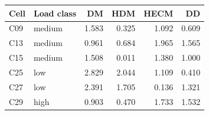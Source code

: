 \begin{tabular}{llrrrr}
\toprule
Cell & Load class & DM & HDM & HECM & DD \\
\midrule
C09 & medium & 1.583 & 0.325 & 1.092 & 0.609 \\
C13 & medium & 0.961 & 0.684 & 1.965 & 1.565 \\
C15 & medium & 1.508 & 0.011 & 1.380 & 1.000 \\
C25 & low & 2.829 & 2.044 & 1.109 & 0.410 \\
C27 & low & 2.391 & 1.705 & 0.136 & 1.321 \\
C29 & high & 0.903 & 0.470 & 1.733 & 1.532 \\
\bottomrule
\end{tabular}
